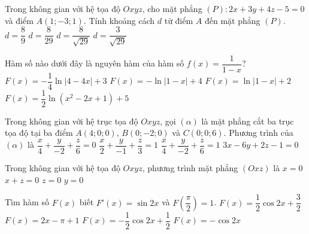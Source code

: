 \begin{ex}%
Trong không gian với hệ tọa độ $Oxyz$, cho mặt phẳng $(P)\colon 2x+3y+4z-5=0$ và điểm $A(1;-3;1)$. Tính khoảng cách $d$ từ điểm $A$ đến mặt phẳng $(P)$.
\choice
{$d=\dfrac{8}{9}$}
{$d=\dfrac{8}{29}$}
{\True $d=\dfrac{8}{\sqrt{29}}$}
{$d=\dfrac{3}{\sqrt{29}}$}
\end{ex}

\begin{ex}%
Hàm số nào dưới đây là nguyên hàm của hàm số $f(x)=\dfrac{1}{1-x}$?
\choice
{$F(x)=-\dfrac{1}{4}\ln|4-4x|+3$}
{\True $F(x)=-\ln|1-x|+4$}
{$F(x)=\ln|1-x|+2$}
{$F(x)=\dfrac{1}{2}\ln(x^2-2x+1)+5$}
\end{ex}

\begin{ex}%
Trong không gian với hệ trục tọa độ $Oxyz$, gọi $(\alpha)$ là mặt phẳng cắt ba trục tọa độ tại ba điểm $A(4;0;0)$, $B(0;-2;0)$ và $C(0;0;6)$. Phương trình của $(\alpha)$ là
\choice
{$\dfrac{x}{4}+\dfrac{y}{-2}+\dfrac{z}{6}=0$}
{$\dfrac{x}{2}+\dfrac{y}{-1}+\dfrac{z}{3}=1$}
{\True $\dfrac{x}{4}+\dfrac{y}{-2}+\dfrac{z}{6}=1$}
{$3x-6y+2z-1=0$}
\end{ex}

\begin{ex}%
Trong không gian với hệ tọa độ $Oxyz$, phương trình mặt phẳng $(Oxz)$ là
\choice
{$x=0$}
{$x+z=0$}
{$z=0$}
{\True $y=0$}
\end{ex}

\begin{ex}%
Tìm hàm số $F(x)$ biết $F'(x)=\sin 2x$ và $F\left(\dfrac{\pi}{2}\right)=1$.
\choice
{$F(x)=\dfrac{1}{2}\cos 2x+\dfrac{3}{2}$}
{$F(x)=2x-\pi+1$}
{\True $F(x)=-\dfrac{1}{2}\cos 2x+\dfrac{1}{2}$}
{$F(x)=-\cos 2x$}
\end{ex}


